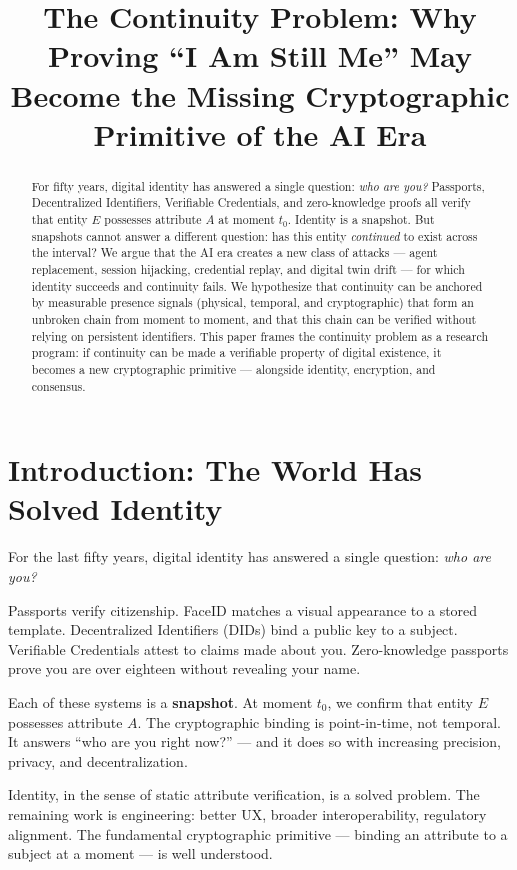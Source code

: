 \documentclass[conference]{IEEEtran}
\title{The Continuity Problem: Why Proving ``I Am Still Me'' May Become the Missing Cryptographic Primitive of the AI Era}
\author{
\IEEEauthorblockN{Raymond Wu}
\IEEEauthorblockA{The Continuity Lab\\
MyShape Protocol\\
\url{https://www.myshape.com/research}}
}
\begin{document}
\maketitle

\begin{abstract}
For fifty years, digital identity has answered a single question: \textit{who are you?} Passports, Decentralized Identifiers, Verifiable Credentials, and zero-knowledge proofs all verify that entity $E$ possesses attribute $A$ at moment $t_0$. Identity is a snapshot. But snapshots cannot answer a different question: has this entity \textit{continued} to exist across the interval? We argue that the AI era creates a new class of attacks — agent replacement, session hijacking, credential replay, and digital twin drift — for which identity succeeds and continuity fails. We hypothesize that continuity can be anchored by measurable presence signals (physical, temporal, and cryptographic) that form an unbroken chain from moment to moment, and that this chain can be verified without relying on persistent identifiers. This paper frames the continuity problem as a research program: if continuity can be made a verifiable property of digital existence, it becomes a new cryptographic primitive — alongside identity, encryption, and consensus.
\end{abstract}

\section{Introduction: The World Has Solved Identity}

For the last fifty years, digital identity has answered a single question: \textit{who are you?}

Passports verify citizenship. FaceID matches a visual appearance to a stored template. Decentralized Identifiers (DIDs) bind a public key to a subject. Verifiable Credentials attest to claims made about you. Zero-knowledge passports prove you are over eighteen without revealing your name.

Each of these systems is a \textbf{snapshot}. At moment $t_0$, we confirm that entity $E$ possesses attribute $A$. The cryptographic binding is point-in-time, not temporal. It answers ``who are you right now?'' — and it does so with increasing precision, privacy, and decentralization.

Identity, in the sense of static attribute verification, is a solved problem. The remaining work is engineering: better UX, broader interoperability, regulatory alignment. The fundamental cryptographic primitive — binding an attribute to a subject at a moment — is well understood.
\end{document}

